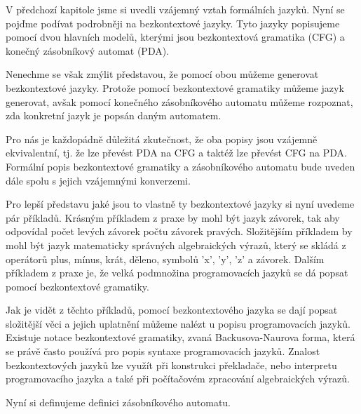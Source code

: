 V předchozí kapitole jsme si uvedli vzájemný vztah formálních jazyků. Nyní se pojďme podívat podrobněji na bezkontextové jazyky. Tyto jazyky popisujeme pomocí dvou hlavních modelů, kterými jsou bezkontextová gramatika (CFG) a konečný zásobníkový automat (PDA).

Nenechme se však zmýlit představou, že pomocí obou můžeme generovat bezkontextové jazyky. Protože pomocí bezkontextové gramatiky můžeme jazyk generovat, avšak pomocí konečného zásobníkového automatu můžeme rozpoznat, zda konkretní jazyk je popsán daným automatem. 

Pro nás je každopádně důležitá zkutečnost, že oba popisy jsou vzájemně ekvivalentní, tj. že lze převést PDA na CFG a taktéž lze převést CFG na PDA. Formální popis bezkontextové gramatiky a zásobníkového automatu bude uveden dále spolu s jejich vzájemnými konverzemi. 

Pro lepší představu jaké jsou to vlastně ty bezkontextové jazyky si nyní uvedeme pár příkladů. Krásným příkladem z praxe by mohl být jazyk závorek, tak aby odpovídal počet levých závorek počtu závorek pravých. Složitějším příkladem by mohl být jazyk matematicky správných algebraických výrazů, který se skládá z operátorů plus, mínus, krát, děleno, symbolů 'x', 'y', 'z' a závorek. Dalším příkladem z praxe je, že velká podmnožina programovacích jazyků se dá popsat pomocí bezkontextové gramatiky. 

Jak je vidět z těchto příkladů, pomocí bezkontextového jazyka se dají popsat složitější věci a jejich uplatnění můžeme nalézt u popisu programovacích jazyků. Existuje notace bezkontextové gramatiky, zvaná Backusova-Naurova forma, která se právě často používá pro popis syntaxe programovacích jazyků. Znalost bezkontextových jazyků lze využít při konstrukci překladače, nebo interpretu programovacího jazyka a také při počítačovém zpracování algebraických výrazů. \cite{CFL}

\newtheorem{mydef}{Definice}
\newtheorem{myAlgorithm}{Algoritmus}

Nyní si definujeme definici zásobníkového automatu. \cite{PDA}

